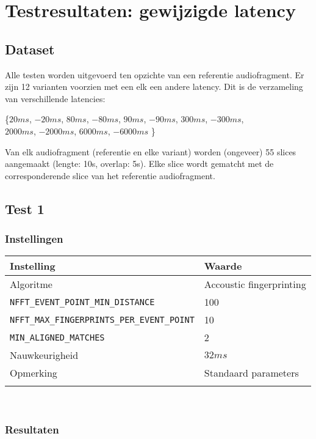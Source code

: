 \chapter{Testresultaten: gewijzigde latency}
\label{appendix-b}

\section*{Dataset}

Alle testen worden uitgevoerd ten opzichte van een referentie audiofragment. Er zijn 12 varianten voorzien met een elk een andere latency. Dit is de verzameling van verschillende latencies:
\begin{center}
	\{$20ms$, $-20ms$, $80ms$, $-80ms$, $90ms$, $-90ms$, $300ms$, $-300ms$, \\$2000ms$, $-2000ms$, $6000ms$, $-6000ms$ \}
\end{center}

Van elk audiofragment (referentie en elke variant) worden (ongeveer) 55 slices aangemaakt (lengte: 10s, overlap: 5s). Elke slice wordt gematcht met de corresponderende slice van het referentie audiofragment.

\section*{Test 1}

\subsection*{Instellingen}

\begin{tabular}{ l  l}
	\hline
	\textbf{Instelling} & \textbf{Waarde} \\
	\hline
	Algoritme & Accoustic fingerprinting \\
	\texttt{NFFT\_EVENT\_POINT\_MIN\_DISTANCE} & 100 \\
	\texttt{NFFT\_MAX\_FINGERPRINTS\_PER\_EVENT\_POINT} & 10 \\
	\texttt{MIN\_ALIGNED\_MATCHES} & 2 \\
	Nauwkeurigheid & $32ms$ \\
	Opmerking & Standaard parameters \\
	\\
\end{tabular}\\

\subsection*{Resultaten}

